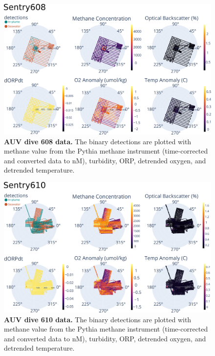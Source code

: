 \begin{figure}
    \centering
    \includegraphics[width=1\columnwidth]{figures/app_sentry608_data.png}
    \caption[AUV \Sentry dive 608 data.]{\textbf{AUV \Sentry dive 608 data.} The binary detections are plotted with methane value from the Pythia methane instrument (time-corrected and converted data to nM), turbidity, ORP, detrended oxygen, and detrended temperature.}
    \label{fig:app:field:sentry608}
\end{figure}


\begin{figure}
    \centering
    \includegraphics[width=1\columnwidth]{figures/app_sentry610_data.png}
    \caption[AUV \Sentry dive 610 data.]{\textbf{AUV \Sentry dive 610 data.} The binary detections are plotted with methane value from the Pythia methane instrument (time-corrected and converted data to nM), turbidity, ORP, detrended oxygen, and detrended temperature.}
    \label{fig:app:field:sentry610}
\end{figure}

